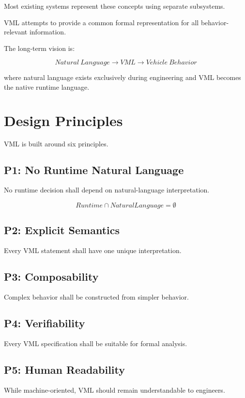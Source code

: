 \documentclass[11pt,a4paper]{article}
\begin{document}
Most existing systems represent these concepts using separate
subsystems.

VML attempts to provide a common formal representation for all
behavior-relevant information.

The long-term vision is:

\[
Natural\ Language
\rightarrow
VML
\rightarrow
Vehicle\ Behavior
\]

where natural language exists exclusively during engineering and VML
becomes the native runtime language.

\section{Design Principles}

VML is built around six principles.

\subsection{P1: No Runtime Natural Language}

No runtime decision shall depend on natural-language interpretation.

\[
Runtime \cap NaturalLanguage = \emptyset
\]

\subsection{P2: Explicit Semantics}

Every VML statement shall have one unique interpretation.

\subsection{P3: Composability}

Complex behavior shall be constructed from simpler behavior.

\subsection{P4: Verifiability}

Every VML specification shall be suitable for formal analysis.

\subsection{P5: Human Readability}

While machine-oriented, VML should remain understandable to engineers.
\end{document}
